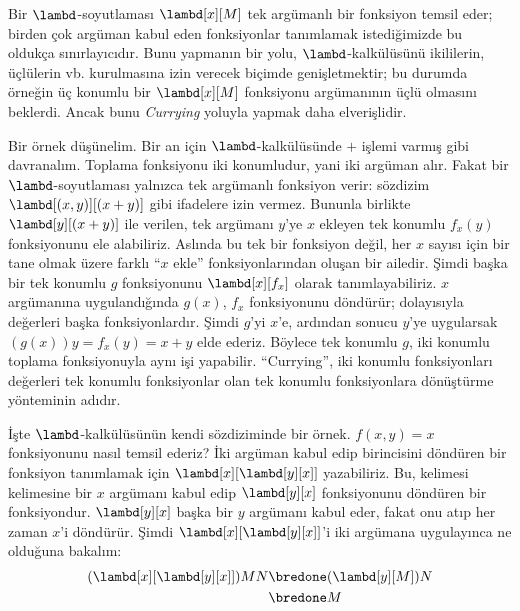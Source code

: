 


Bir $\lambd$-soyutlaması $\lambd[x][M]$ tek argümanlı bir fonksiyon temsil
eder; birden çok argüman kabul eden fonksiyonlar tanımlamak istediğimizde bu
oldukça sınırlayıcıdır. Bunu yapmanın bir yolu, $\lambd$-kalkülüsünü
ikililerin, üçlülerin vb. kurulmasına izin verecek biçimde genişletmektir;
bu durumda örneğin üç konumlu bir $\lambd[x][M]$ fonksiyonu argümanının üçlü
olmasını beklerdi. Ancak bunu \emph{Currying} yoluyla yapmak daha elverişlidir.

Bir örnek düşünelim. Bir an için $\lambd$-kalkülüsünde $+$ işlemi varmış gibi
davranalım. Toplama fonksiyonu iki konumludur, yani iki argüman alır. Fakat
bir $\lambd$-soyutlaması yalnızca tek argümanlı fonksiyon verir: sözdizim
$\lambd[(x,y)][(x+y)]$ gibi ifadelere izin vermez. Bununla birlikte
$\lambd[y][(x+y)]$ ile verilen, tek argümanı $y$'ye $x$ ekleyen tek konumlu
$f_x(y)$ fonksiyonunu ele alabiliriz. Aslında bu tek bir fonksiyon değil,
her $x$ sayısı için bir tane olmak üzere farklı ``$x$ ekle'' fonksiyonlarından
oluşan bir ailedir. Şimdi başka bir tek konumlu $g$ fonksiyonunu
$\lambd[x][f_x]$ olarak tanımlayabiliriz. $x$ argümanına uygulandığında
$g(x)$, $f_x$ fonksiyonunu döndürür; dolayısıyla değerleri başka
fonksiyonlardır. Şimdi $g$'yi $x$'e, ardından sonucu $y$'ye uygularsak
$(g(x))y=f_x(y)=x+y$ elde ederiz. Böylece tek konumlu $g$, iki konumlu
toplama fonksiyonuyla aynı işi yapabilir. ``Currying'', iki konumlu
fonksiyonları değerleri tek konumlu fonksiyonlar olan tek konumlu
fonksiyonlara dönüştürme yönteminin adıdır.

İşte $\lambd$-kalkülüsünün kendi sözdiziminde bir örnek. $f(x,y)=x$
fonksiyonunu nasıl temsil ederiz? İki argüman kabul edip birincisini döndüren
bir fonksiyon tanımlamak için $\lambd[x][\lambd[y][x]]$ yazabiliriz. Bu,
kelimesi kelimesine bir $x$ argümanı kabul edip $\lambd[y][x]$ fonksiyonunu
döndüren bir fonksiyondur. $\lambd[y][x]$ başka bir $y$ argümanı kabul eder,
fakat onu atıp her zaman $x$'i döndürür. Şimdi
$\lambd[x][\lambd[y][x]]$'i iki argümana uygulayınca ne olduğuna bakalım:
\begin{align*}
  (\lambd[x][\lambd[y][x]])MN 
  \bredone & (\lambd[y][M])N \\
  \bredone & M
\end{align*}

